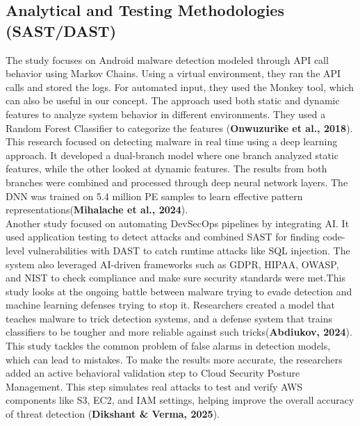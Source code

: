 \subsection{Analytical and Testing Methodologies (SAST/DAST)}
The study focuses on Android malware detection modeled through API call behavior using Markov Chains. Using a virtual environment, they ran the API calls and stored the logs. For automated input, they used the Monkey tool, which can also be useful in our concept. The approach used both static and dynamic features to analyze system behavior in different environments. They used a Random Forest Classifier to categorize the features (\textbf{Onwuzurike et al., 2018})\cite{Onwuzurike}.\\

This research focused on detecting malware in real time using a deep learning approach. It developed a dual-branch model where one branch analyzed static features, while the other looked at dynamic features. The results from both branches were combined and processed through deep neural network layers. The DNN was trained on 5.4 million PE samples to learn effective pattern representations(\textbf{Mihalache et al., 2024})\cite{RaduMihalache}.\\

Another study focused on automating DevSecOps pipelines by integrating AI. It used application testing to detect attacks and combined SAST for finding code-level vulnerabilities with DAST to catch runtime attacks like SQL injection. The system also leveraged AI-driven frameworks such as GDPR, HIPAA, OWASP, and NIST to check compliance and make sure security standards were met.This study looks at the ongoing battle between malware trying to evade detection and machine learning defenses trying to stop it. Researchers created a model that teaches malware to trick detection systems, and a defense system that trains classifiers to be tougher and more reliable against such tricks(\textbf{Abdiukov, 2024})\cite{Abdiukov}.\\

This study tackles the common problem of false alarms in detection models, which can lead to mistakes. To make the results more accurate, the researchers added an active behavioral validation step to Cloud Security Posture Management. This step simulates real attacks to test and verify AWS components like S3, EC2, and IAM settings, helping improve the overall accuracy of threat detection (\textbf{Dikshant \& Verma, 2025})\cite{Dikshant}.\\

